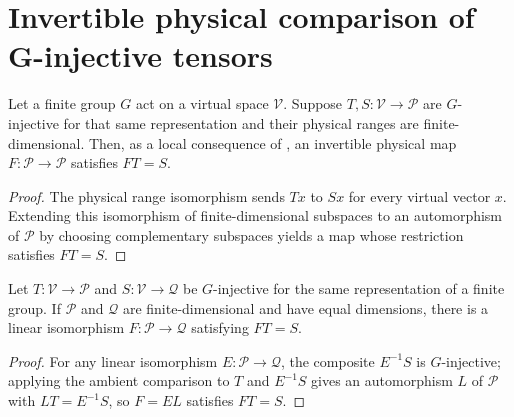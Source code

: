 \section{Invertible physical comparison of G-injective tensors}%
\label{sec:peps_g_injective_physical_equivalence}

\begin{lemma}%
    \label{thm:peps_g_injective_ambient_physical_comparison}
    \leanok
    Let a finite group $G$ act on a virtual space $\mathcal V$.
    Suppose $T,S:\mathcal V\to\mathcal P$ are $G$-injective for
    that same representation and their physical ranges are
    finite-dimensional. Then, as a local consequence of
    \cite[Definition~5.1]{Schuch2010PEPS}, an invertible physical map
    $F:\mathcal P\to\mathcal P$ satisfies $FT=S$.
\end{lemma}

\begin{proof}\leanok
    The physical range isomorphism sends $Tx$ to $Sx$ for every
    virtual vector $x$. Extending this isomorphism of finite-dimensional
    subspaces to an automorphism of $\mathcal P$ by choosing
    complementary subspaces yields a map whose restriction satisfies $FT=S$.
\end{proof}

\begin{lemma}%
    \label{thm:peps_g_injective_equal_dim_physical_comparison}
    \leanok
    Let $T:\mathcal V\to\mathcal P$ and
    $S:\mathcal V\to\mathcal Q$ be $G$-injective for the same
    representation of a finite group. If $\mathcal P$ and
    $\mathcal Q$ are finite-dimensional and have equal dimensions,
    there is a linear isomorphism $F:\mathcal P\to\mathcal Q$
    satisfying $FT=S$.
\end{lemma}

\begin{proof}\leanok
    For any linear isomorphism $E:\mathcal P\to\mathcal Q$,
    the composite $E^{-1}S$ is $G$-injective; applying the ambient comparison
    to $T$ and $E^{-1}S$ gives an automorphism $L$ of
    $\mathcal P$ with $LT=E^{-1}S$, so $F=EL$ satisfies $FT=S$.
\end{proof}
